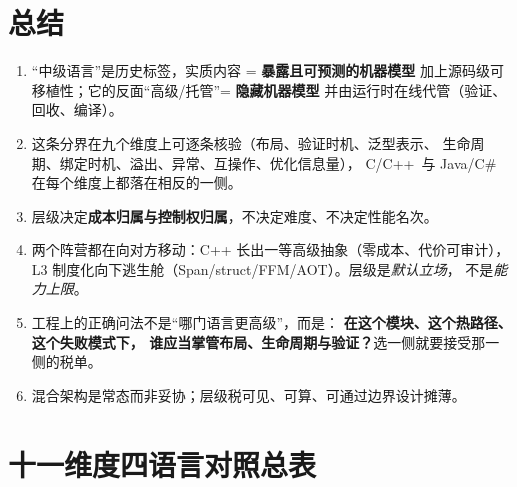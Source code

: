 \documentclass[12pt,a4paper,fontset=fandol]{ctexbook}
\newcommand{\Cplus}[1]{C++\,#1}
\begin{document}
\chapter{总结}

\begin{enumerate}
  \item ``中级语言''是历史标签，实质内容 = \textbf{暴露且可预测的机器模型}
        加上源码级可移植性；它的反面``高级/托管''= \textbf{隐藏机器模型}
        并由运行时在线代管（验证、回收、编译）。
  \item 这条分界在九个维度上可逐条核验（布局、验证时机、泛型表示、
        生命周期、绑定时机、溢出、异常、互操作、优化信息量），
        C/\allowbreak{}\Cplus{} 与 Java/C\# 在每个维度上都落在相反的一侧。
  \item 层级决定\textbf{成本归属与控制权归属}，不决定难度、不决定性能名次。
  \item 两个阵营都在向对方移动：C++ 长出一等高级抽象（零成本、代价可审计），
        L3 制度化向下逃生舱（Span/struct/FFM/AOT）。层级是\emph{默认立场}，
        不是\emph{能力上限}。
  \item 工程上的正确问法不是``哪门语言更高级''，而是：
        \textbf{在这个模块、这个热路径、这个失败模式下，
        谁应当掌管布局、生命周期与验证？}选一侧就要接受那一侧的税单。
  \item 混合架构是常态而非妥协；层级税可见、可算、可通过边界设计摊薄。
\end{enumerate}

\appendix

\chapter{十一维度四语言对照总表}
\end{document}
